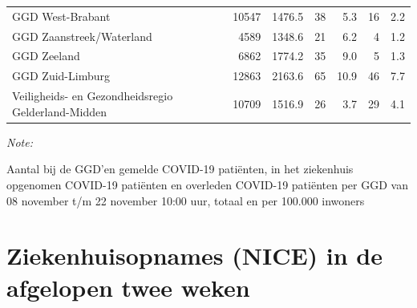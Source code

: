 \documentclass[
  english,
  man,floatsintext]{apa6}
\begin{document}
\begin{table}
\begin{threeparttable}
\begin{tabular}{lrrrrrr}
GGD West-Brabant & 10547 & 1476.5 & 38 & 5.3 & 16 & 2.2\\
GGD Zaanstreek/Waterland & 4589 & 1348.6 & 21 & 6.2 & 4 & 1.2\\
GGD Zeeland & 6862 & 1774.2 & 35 & 9.0 & 5 & 1.3\\
GGD Zuid-Limburg & 12863 & 2163.6 & 65 & 10.9 & 46 & 7.7\\
Veiligheids- en Gezondheidsregio Gelderland-Midden & 10709 & 1516.9 & 26 & 3.7 & 29 & 4.1\\
\bottomrule
\end{tabular}
\begin{tablenotes}
\item \textit{Note: } 
\item Aantal bij de GGD’en gemelde COVID-19 patiënten, in het ziekenhuis opgenomen COVID-19 patiënten en overleden COVID-19 patiënten per GGD van 08 november t/m 22 november 10:00 uur, totaal en per 100.000 inwoners
\end{tablenotes}
\end{threeparttable}
\endgroup{}
\end{table}

\newpage

\hypertarget{ziekenhuisopnames-nice-in-de-afgelopen-twee-weken}{%
\section{Ziekenhuisopnames (NICE) in de afgelopen twee weken}\label{ziekenhuisopnames-nice-in-de-afgelopen-twee-weken}}
\end{document}
